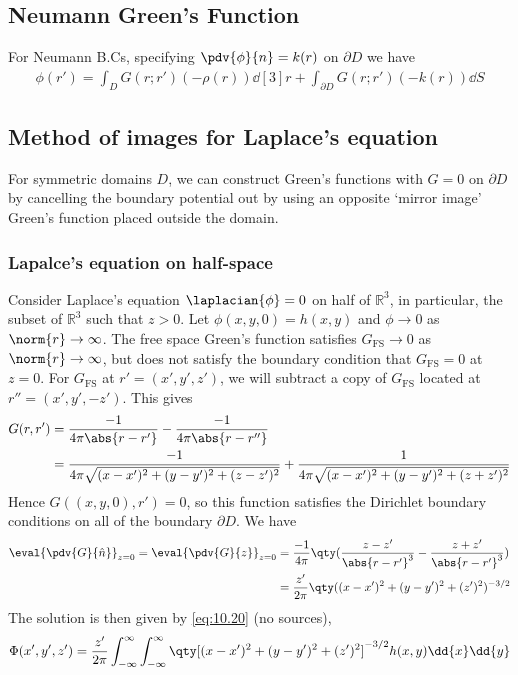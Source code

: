 \subsection{Neumann Green's Function}
For Neumann B.Cs, specifying $\pdv{\phi}{n} = k(r)$ on $\partial D$ we have
\begin{align} \label{eq:10.21}
	\phi(r') = \int_D G(r;r')(-\rho(r)) \dd[3]{r} + \int_{\partial D} G(r;r') (-k(r)) \dd{S}
\end{align}

\subsection{Method of images for Laplace's equation}
For symmetric domains $D$, we can construct Green's functions with $G = 0$ on $\partial D$ by cancelling the boundary potential out by using an opposite `mirror image' Green's function placed outside the domain.

\subsubsection{Lapalce's equation on half-space}
Consider Laplace's equation $\laplacian{\phi} = 0$ on half of $\mathbb R^3$, in particular, the subset of $\mathbb R^3$ such that $z > 0$.
Let $\phi(x,y,0) = h(x,y)$ and $\phi \to 0$ as $\norm{r} \to \infty$.
The free space Green's function satisfies $G_{\mathrm{FS}} \to 0$ as $\norm{r} \to \infty$, but does not satisfy the boundary condition that $G_{\mathrm{FS}} = 0$ at $z = 0$.
For $G_{\mathrm{FS}}$ at $r' = (x',y',z')$, we will subtract a copy of $G_{\mathrm{FS}}$ located at $r'' = (x',y',-z')$.
This gives
\begin{align*}
	G(r,r') & = \frac{-1}{4\pi \abs{r - r'}} - \frac{-1}{4\pi \abs{r - r''}}                                                 \\
	        & = \frac{-1}{4\pi \sqrt{(x-x')^2 + (y-y')^2 + (z-z')^2}} + \frac{1}{4\pi \sqrt{(x-x')^2 + (y-y')^2 + (z+z')^2}}
\end{align*}
Hence $G((x,y,0), r') = 0$, so this function satisfies the Dirichlet boundary conditions on all of the boundary $\partial D$.
We have
\begin{align} \label{eq:10.22}
	\eval{\pdv{G}{\hat n}}_{z = 0} = \eval{\pdv{G}{z}}_{z = 0} &= \frac{-1}{4\pi} \qty(\frac{z - z'}{\abs{r - r'}^3} - \frac{z + z'}{\abs{r-r'}^3}) \\
	&= \frac{z'}{2\pi} \qty((x-x')^2 + (y-y')^2 + (z')^2)^{-3/2} \notag
\end{align}
The solution is then given by \cref{eq:10.20} (no sources),
\begin{align} \label{eq:10.23}
	\Phi(x',y',z') = \frac{z'}{2\pi} \int_{-\infty}^\infty \int_{-\infty}^\infty \qty[ (x - x')^2 + (y-y')^2 + (z')^2 ]^{-3/2} h(x,y) \dd{x}\dd{y}
\end{align}

